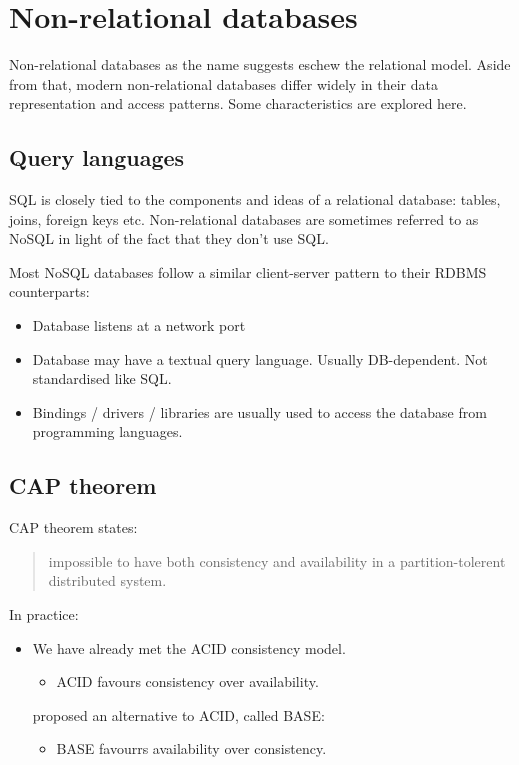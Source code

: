 \documentclass[slides]{pgnotes}
\begin{document}
\section{Non-relational databases}

Non-relational databases as the name suggests eschew the relational model.
Aside from that, modern non-relational databases differ widely in their data representation and access patterns.
Some characteristics are explored here.


\subsection{Query languages}

SQL is closely tied to the components and ideas of a relational database: tables, joins, foreign keys etc.
Non-relational databases are sometimes referred to as NoSQL in light of the fact that they don't use SQL. 

Most NoSQL databases follow a similar client-server pattern to their RDBMS counterparts:
\begin{itemize}
\item Database listens at a network port
\item Database may have a textual query language. Usually DB-dependent. Not standardised like SQL.
\item Bindings / drivers / libraries are usually used to access the database from programming languages.
\end{itemize}

\subsection{CAP theorem}

CAP theorem states:
\begin{quotation}
  impossible to have both consistency and availability in a partition-tolerent distributed system.
\end{quotation}

In practice:

\begin{itemize}
  \item   We have already met the ACID consistency model.
  \begin{itemize}
  \item ACID favours consistency over availability.
  \end{itemize}
  \citet{pritchett:2008:base} proposed an alternative to ACID, called BASE:
  \begin{itemize}
  \item BASE favourrs availability over consistency.
  \end{itemize}
\end{itemize}
\end{document}
